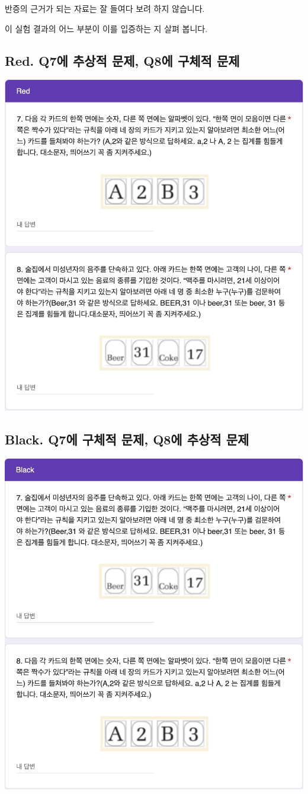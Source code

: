 \documentclass[
]{book}
\begin{document}
반증의 근거가 되는 자료는 잘 들여다 보려 하지 않습니다.

이 실험 결과의 어느 부분이 이를 입증하는 지 살펴 봅니다.

\subsection{Red. Q7에 추상적 문제, Q8에 구체적 문제}\label{red.-q7uxc5d0-uxcd94uxc0c1uxc801-uxbb38uxc81c-q8uxc5d0-uxad6cuxccb4uxc801-uxbb38uxc81c}

\begin{flushleft}\includegraphics[width=0.75\linewidth]{./pics/Quiz240412_Q7_Red} \end{flushleft}

\subsection{Black. Q7에 구체적 문제, Q8에 추상적 문제}\label{black.-q7uxc5d0-uxad6cuxccb4uxc801-uxbb38uxc81c-q8uxc5d0-uxcd94uxc0c1uxc801-uxbb38uxc81c}

\begin{flushleft}\includegraphics[width=0.75\linewidth]{./pics/Quiz240412_Q7_Black} \end{flushleft}
\end{document}
